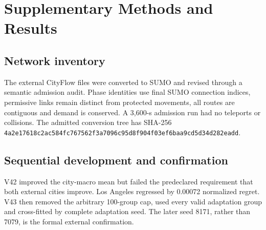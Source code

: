 \section{Supplementary Methods and Results}

\subsection{Network inventory}
\label{sec:supp-network-inventory}

\begin{table}[htbp]
\caption{Source and external target network inventory parsed from the SUMO
\texttt{net.xml} files.  Jinan uses one geometry and three demand files.}
\label{tab:network-scope}
\centering
\scriptsize
\resizebox{\textwidth}{!}{}
\end{table}

The external CityFlow files were converted to SUMO and revised through a
semantic admission audit.  Phase identities use final SUMO connection indices,
permissive links remain distinct from protected movements, all routes are
contiguous and demand is conserved.  A 3,600-s admission run had no teleports
or collisions.  The admitted conversion tree has SHA-256
\texttt{4a2e17618c2ac584fc767562f3a7096c95d8f904f03ef6baa9cd5d34d282eadd}.

\subsection{Sequential development and confirmation}
\label{sec:supp-development-history}

\begin{table}[htbp]
\caption{Sequential development and confirmation of the pairwise method.  Positive
percentages denote lower normalized action regret than the rigid anchor.  Seed
7079 is diagnostic evidence that informed V43 and is not reused as V43
confirmation.}
\label{tab:development-history}
\centering
\scriptsize
\resizebox{\textwidth}{!}{}
\end{table}

V42 improved the city-macro mean but failed the predeclared requirement that
both external cities improve.  Los Angeles regressed by 0.00072 normalized
regret.  V43 then
removed the arbitrary 100-group cap, used every valid adaptation group and
cross-fitted by complete adaptation seed.  The later seed 8171, rather than
7079, is the formal external confirmation.

